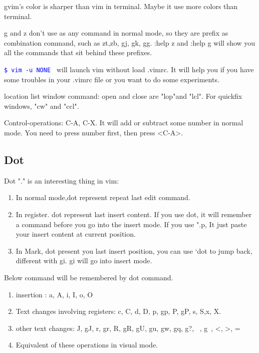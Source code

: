 \documentclass[paper=8.5in:11in, twoside, 12pt, pagesize=pdftex]{book}
\newcommand{\linuxcommand}[1]{\texttt{\textcolor{blue}{\$ #1 \Pisymbol{psy}{191}}}}
\begin{document}
gvim's color is sharper than vim in terminal.  Maybe it use more colors than terminal.  

g and z don't use as any command in normal mode, so they are prefix as combination command, such as zt,zb, gj, gk, gg. :help z and :help g will show you all the commands that sit behind these prefixes.

\linuxcommand{vim -u NONE} will launch vim without load .vimrc. It will help you if you have some troubles in your .vimrc file or you want to do some experiments. 

location list window command: open and close are "lop"and "lcl". For quickfix windows, "cw" and "ccl".

Control-operations: C-A, C-X. It will add or subtract some number in normal mode. You need to press number first, then press <C-A>.

\subsection{Dot}


Dot "." is an interesting thing in vim:

\begin{enumerate}
	\item In normal mode,dot represent repeat last edit command.
	
	\item In register. dot represent last insert content. If you use dot, it will remember a command before you go into the insert mode. If you use ".p, It just paste your insert content at current position. 
	
	\item In Mark, dot present you last insert position, you can use `dot to jump back, different with gi. gi will go into insert mode.
\end{enumerate}

Below command will be remembered by dot command.
\begin{enumerate}
	\item insertion : a, A, i, I, o, O
	
	\item Text changes involving registers: c, C, d, D, p, gp, P, gP, s, S,x, X.
	
	\item other text changes: J, gJ, r, gr, R, gR, gU, gu, gw, gq, g?, ~, g~, <, >, =
	
	\item Equivalent of these operations in visual mode.
	
\end{enumerate}
\end{document}
